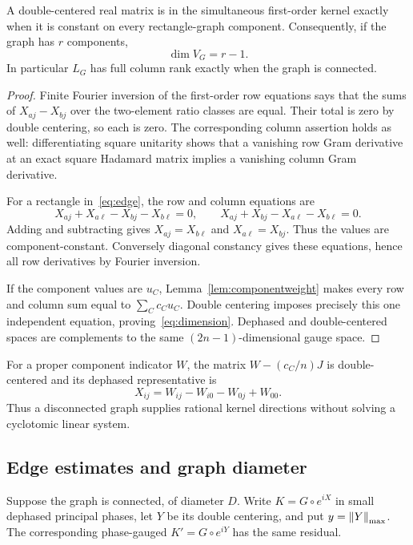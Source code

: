 \begin{theorem}\label{thm:graphkernel}
A double-centered real matrix is in the simultaneous first-order kernel exactly when it is constant on every rectangle-graph component. Consequently, if the graph has $r$ components,
\begin{equation}\label{eq:dimension}
 \dim V_G=r-1.
\end{equation}
In particular $L_G$ has full column rank exactly when the graph is connected.
\end{theorem}
\begin{proof}
Finite Fourier inversion of the first-order row equations says that the sums of $X_{aj}-X_{bj}$ over the two-element ratio classes are equal. Their total is zero by double centering, so each is zero. The corresponding column assertion holds as well: differentiating square unitarity shows that a vanishing row Gram derivative at an exact square Hadamard matrix implies a vanishing column Gram derivative.

For a rectangle in~\eqref{eq:edge}, the row and column equations are
\[
 X_{aj}+X_{a\ell}-X_{bj}-X_{b\ell}=0,\qquad
 X_{aj}+X_{bj}-X_{a\ell}-X_{b\ell}=0.
\]
Adding and subtracting gives $X_{aj}=X_{b\ell}$ and $X_{a\ell}=X_{bj}$. Thus the values are component-constant. Conversely diagonal constancy gives these equations, hence all row derivatives by Fourier inversion.

If the component values are $u_C$, Lemma~\ref{lem:componentweight} makes every row and column sum equal to $\sum_Cc_Cu_C$. Double centering imposes precisely this one independent equation, proving~\eqref{eq:dimension}. Dephased and double-centered spaces are complements to the same $(2n-1)$-dimensional gauge space.
\end{proof}
For a proper component indicator $W$, the matrix $W-(c_C/n)J$ is double-centered and its dephased representative is
\[
 X_{ij}=W_{ij}-W_{i0}-W_{0j}+W_{00}.
\]
Thus a disconnected graph supplies rational kernel directions without solving a cyclotomic linear system.

\subsection{Edge estimates and graph diameter}
Suppose the graph is connected, of diameter $D$. Write $K=G\circ e^{iX}$ in small dephased principal phases, let $Y$ be its double centering, and put $y=\left\lVert Y\right\rVert_{\mathrm{max}}$. The corresponding phase-gauged $K'=G\circ e^{iY}$ has the same residual.


